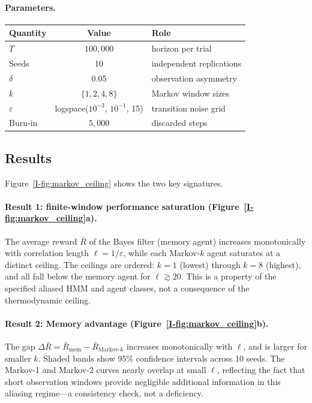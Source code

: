 \documentclass[12pt,a4paper,openany]{book}
\begin{document}
\paragraph{Parameters.}
\begin{center}
\small
\begin{tabular}{@{}lcl@{}}
\toprule
\textbf{Quantity} & \textbf{Value} & \textbf{Role} \\
\midrule
$T$ & $100{,}000$ & horizon per trial \\
Seeds & 10 & independent replications \\
$\delta$ & 0.05 & observation asymmetry \\
$k$ & $\{1, 2, 4, 8\}$ & Markov window sizes \\
$\varepsilon$ & logspace($10^{-3}$, $10^{-1}$, 15)
  & transition noise grid \\
Burn-in & $5{,}000$ & discarded steps \\
\bottomrule
\end{tabular}
\end{center}

\subsection{Results}
\label{I-subsec:demo_results}

Figure~\ref{I-fig:markov_ceiling} shows the two key signatures.

\paragraph{Result 1: finite-window performance saturation
(Figure~\ref{I-fig:markov_ceiling}a).}
The average reward $\bar{R}$ of the Bayes filter (memory
agent) increases monotonically with correlation length
$\ell = 1/\varepsilon$, while each Markov-$k$ agent
saturates at a distinct ceiling.  The ceilings are
ordered: $k = 1$ (lowest) through $k = 8$ (highest),
and all fall below the memory agent for
$\ell \gtrsim 20$.  This is a property of the specified
aliased HMM and agent classes, not a consequence of the
thermodynamic ceiling.

\paragraph{Result 2: Memory advantage
(Figure~\ref{I-fig:markov_ceiling}b).}
The gap $\Delta\bar{R} = \bar{R}_{\mathrm{mem}}
- \bar{R}_{\mathrm{Markov}\text{-}k}$ increases
monotonically with $\ell$, and is larger for smaller $k$.
Shaded bands show 95\% confidence intervals across
10 seeds.  The Markov-1 and Markov-2 curves nearly
overlap at small $\ell$, reflecting the fact that
short observation windows provide negligible additional
information in this aliasing regime---a consistency
check, not a deficiency.
\end{document}
